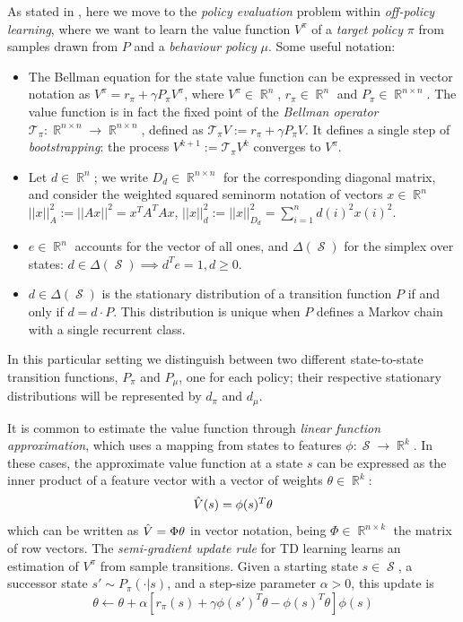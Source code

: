 \documentclass[12pt,a4paper,openright,twoside]{article}
\DeclareMathOperator*{\R}{\mathbb{R}}
\DeclareMathOperator*{\Sspace}{\mathcal{S}}
\numberwithin{equation}{section}
\theoremstyle{definition}
\theoremstyle{remark}
\theoremstyle{plain}
\begin{document}
As stated in \cite{DCOPTD}, here we move to the \textit{policy evaluation} problem within \textit{off-policy learning}, where we want to learn the value function $V^\pi$ of a \textit{target policy} $\pi$ from samples drawn from $P$ and a \textit{behaviour policy} $\mu$. Some useful notation:
\begin{itemize}
    \item The Bellman equation for the state value function can be expressed in vector notation as $V^\pi = r_\pi + \gamma P_\pi V^\pi$, where $V^\pi \in \R^{n}$, $r_\pi \in \R^n$ and $P_\pi \in \R^{n \times n}$. The value function is in fact the fixed point of the \textit{Bellman operator} $\mathcal{T}_\pi: \R^{n \times n} \rightarrow \R^{n \times n}$, defined as $\mathcal{T}_\pi V := r_\pi + \gamma P_\pi V $. It defines a single step of \textit{bootstrapping}: the process $V^{k+1} := \mathcal{T}_\pi V^k$ converges to $V^\pi$.
    \item Let $d \in \R^n$; we write $D_d \in \R^{n\times n}$ for the corresponding diagonal matrix, and consider the weighted squared seminorm notation of vectors $x\in\R^n$ $||x||^2_{A} := ||A x||^2 = x^T A^T A x$, $||x||^2_d :=||x||^2_{D_d}= \sum_{i=1}^n d(i)^2 x(i)^2$.
    \item $e\in\R^n$ accounts for the vector of all ones, and $\Delta(\Sspace)$ for the simplex over states: $d \in \Delta(\Sspace) \implies d^T e = 1, d \geq 0$.
    \item $d \in \Delta(\Sspace)$ is the stationary distribution of a transition function $P$ if and only if $d=d \cdot P$. This distribution is unique when $P$ defines a Markov chain with a single recurrent class\cite{unichain}.
\end{itemize}
In this particular setting we distinguish between two different state-to-state transition functions, $P_\pi$ and $P_\mu$, one for each policy; their respective stationary distributions will be represented by $d_\pi$ and $d_\mu$. 

It is common to estimate the value function through \textit{linear function approximation}, which uses a mapping from states to features $\phi: \Sspace \rightarrow \R^k$. In these cases, the approximate value function at a state $s$ can be expressed as the inner product of a feature vector with a vector of weights $\theta \in \R^k$:
\begin{equation} \label{linearApproxSV}
    \Hat{V}(s) = \phi(s)^T \theta
\end{equation}
which can be written as $\Hat{V} = \Phi \theta$ in vector notation, being $\Phi \in \R^{n\times k}$ the matrix of row vectors. The \textit{semi-gradient update rule} for TD learning\cite{TD} learns an estimation of $V^\pi$ from sample transitions. Given a starting state $s\in\Sspace$, a successor state $s'\sim P_\pi(\cdot | s)$, and a step-size parameter $\alpha > 0$, this update is
\begin{equation} \label{updateTD}
    \theta \leftarrow \theta + \alpha \left[ r_\pi(s) + \gamma\phi(s')^T \theta - \phi(s)^T \theta \right] \phi(s)
\end{equation}
\end{document}
